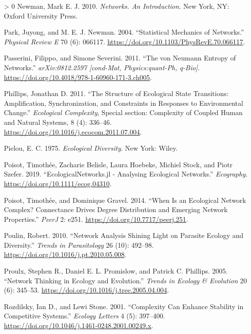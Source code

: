 \documentclass[10pt,oneside]{article}
\newlength{\cslhangindent}
\newenvironment{CSLReferences}[3] %
 {%
  \setlength{\parindent}{0pt}
  \ifodd #1 \everypar{\setlength{\hangindent}{\cslhangindent}}\ignorespaces\fi
  \ifnum #2 > 0
  \setlength{\parskip}{#2\baselineskip}
  \fi
 }%
 {}
\begin{document}
\begin{CSLReferences}{1}{0}
\leavevmode\hypertarget{ref-Newman2010NetInt}{}%
Newman, Mark E. J. 2010. \emph{Networks. An Introduction}. New York, NY:
Oxford University Press.

\leavevmode\hypertarget{ref-Park2004StaMec}{}%
Park, Juyong, and M. E. J. Newman. 2004. {``Statistical Mechanics of
Networks.''} \emph{Physical Review E} 70 (6): 066117.
\url{https://doi.org/10.1103/PhysRevE.70.066117}.

\leavevmode\hypertarget{ref-Passerini2011NeuEnt}{}%
Passerini, Filippo, and Simone Severini. 2011. {``The von Neumann
Entropy of Networks.''} \emph{arXiv:0812.2597 {[}cond-Mat,
Physics:quant-Ph, q-Bio{]}}.
\url{https://doi.org/10.4018/978-1-60960-171-3.ch005}.

\leavevmode\hypertarget{ref-Phillips2011StrEco}{}%
Phillips, Jonathan D. 2011. {``The Structure of Ecological State
Transitions: Amplification, Synchronization, and Constraints in
Responses to Environmental Change.''} \emph{Ecological Complexity},
Special section: Complexity of Coupled Human and Natural Systems, 8 (4):
336--46. \url{https://doi.org/10.1016/j.ecocom.2011.07.004}.

\leavevmode\hypertarget{ref-Pielou1975EcoDiv}{}%
Pielou, E. C. 1975. \emph{Ecological Diversity}. New York: Wiley.

\leavevmode\hypertarget{ref-Poisot2019EcoJl}{}%
Poisot, Timothée, Zacharie Belisle, Laura Hoebeke, Michiel Stock, and
Piotr Szefer. 2019. {``EcologicalNetworks.jl - Analysing Ecological
Networks.''} \emph{Ecography}. \url{https://doi.org/10.1111/ecog.04310}.

\leavevmode\hypertarget{ref-Poisot2014WheEco}{}%
Poisot, Timothée, and Dominique Gravel. 2014. {``When Is an Ecological
Network Complex? Connectance Drives Degree Distribution and Emerging
Network Properties.''} \emph{PeerJ} 2: e251.
\url{https://doi.org/10.7717/peerj.251}.

\leavevmode\hypertarget{ref-Poulin2010NetAna}{}%
Poulin, Robert. 2010. {``Network Analysis Shining Light on Parasite
Ecology and Diversity.''} \emph{Trends in Parasitology} 26 (10):
492--98. \url{https://doi.org/10.1016/j.pt.2010.05.008}.

\leavevmode\hypertarget{ref-Proulx2005NetThi}{}%
Proulx, Stephen R., Daniel E. L. Promislow, and Patrick C. Phillips.
2005. {``Network Thinking in Ecology and Evolution.''} \emph{Trends in
Ecology \& Evolution} 20 (6): 345--53.
\url{https://doi.org/10.1016/j.tree.2005.04.004}.

\leavevmode\hypertarget{ref-Rozdilsky2001ComCan}{}%
Rozdilsky, Ian D., and Lewi Stone. 2001. {``Complexity Can Enhance
Stability in Competitive Systems.''} \emph{Ecology Letters} 4 (5):
397--400. \url{https://doi.org/10.1046/j.1461-0248.2001.00249.x}.


\end{CSLReferences}
\end{document}
